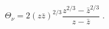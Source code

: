 \begin{equation}
\Theta _{\nu }=2(z\bar{z})^{2/3}\frac{z^{2/3}-\bar{z}^{2/3}}{z-\bar{z}}\;.
\label{Schuster}
\end{equation}

